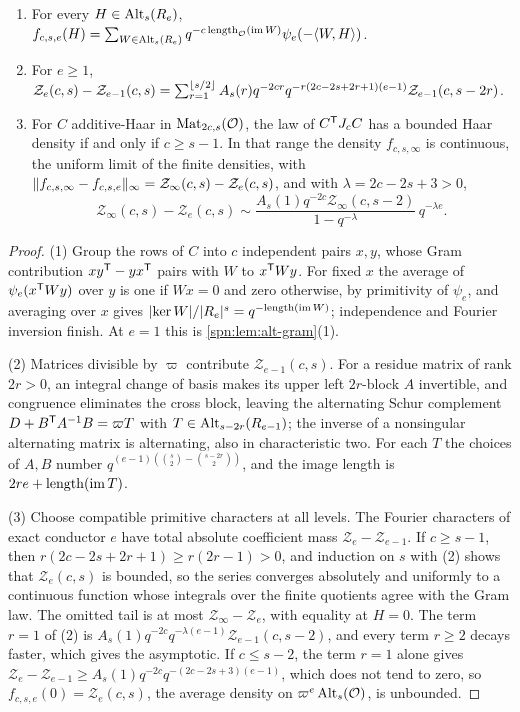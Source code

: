 \begin{theorem}\label{spn:thm:gram-regularity}
\begin{enumerate}
\item For every $H\in\operatorname{Alt}_s(R_e)$,
$f_{c,s,e}(H)=\sum_{W\in\operatorname{Alt}_s(R_e)}q^{-c\,\mathrm{length}_{\mathcal{O}}(\operatorname{im} W)}\psi_e(-\langle W,H\rangle)$.
\item For $e\ge1$,
$\mathcal Z_e(c,s)-\mathcal Z_{e-1}(c,s)=\sum_{r=1}^{\lfloor s/2\rfloor}A_s(r)q^{-2cr}q^{-r(2c-2s+2r+1)(e-1)}\mathcal Z_{e-1}(c,s-2r)$.
\item For $C$ additive-Haar in $\operatorname{Mat}_{2c,s}(\mathcal{O})$, the law of $C^{\mathsf{T}}J_cC$ has a bounded Haar
density if and only if $c\ge s-1$. In that range the density $f_{c,s,\infty}$ is continuous, the
uniform limit of the finite densities, with
$\lVert f_{c,s,\infty}-f_{c,s,e}\rVert_\infty=\mathcal Z_\infty(c,s)-\mathcal Z_e(c,s)$, and with $\lambda=2c-2s+3>0$,
\[
 \mathcal Z_\infty(c,s)-\mathcal Z_e(c,s)\sim\frac{A_s(1)q^{-2c}\mathcal Z_\infty(c,s-2)}{1-q^{-\lambda}}\,q^{-\lambda e}.
\]
\end{enumerate}
\end{theorem}

\begin{proof}
(1) Group the rows of $C$ into $c$ independent pairs $x,y$, whose Gram contribution
$xy^{\mathsf{T}}-yx^{\mathsf{T}}$ pairs with $W$ to $x^{\mathsf{T}}Wy$. For fixed $x$ the average of
$\psi_e(x^{\mathsf{T}}Wy)$ over $y$ is one if $Wx=0$ and zero otherwise, by primitivity of $\psi_e$, and
averaging over $x$ gives $\lvert\ker W\rvert/\lvert R_e\rvert^s=q^{-\mathrm{length}(\operatorname{im} W)}$; independence and
Fourier inversion finish. At $e=1$ this is \cref{spn:lem:alt-gram}(1).

(2) Matrices divisible by $\varpi$ contribute $\mathcal Z_{e-1}(c,s)$. For a residue matrix of rank $2r>0$, an
integral change of basis makes its upper left $2r$-block $A$ invertible, and congruence eliminates the
cross block, leaving the alternating Schur complement $D+B^{\mathsf{T}}A^{-1}B=\varpi T$ with
$T\in\operatorname{Alt}_{s-2r}(R_{e-1})$; the inverse of a nonsingular alternating matrix is alternating, also in
characteristic two. For each $T$ the choices of $A,B$ number
$q^{(e-1)(\binom s2-\binom{s-2r}2)}$, and the image length is $2re+\mathrm{length}(\operatorname{im} T)$.

(3) Choose compatible primitive characters at all levels. The Fourier characters of exact conductor
$e$ have total absolute coefficient mass $\mathcal Z_e-\mathcal Z_{e-1}$. If $c\ge s-1$, then
$r(2c-2s+2r+1)\ge r(2r-1)>0$, and induction on $s$ with (2) shows that $\mathcal Z_e(c,s)$ is bounded, so the
series converges absolutely and uniformly to a continuous function whose integrals over the finite
quotients agree with the Gram law. The omitted tail is at most $\mathcal Z_\infty-\mathcal Z_e$, with equality at
$H=0$. The term $r=1$ of (2) is $A_s(1)q^{-2c}q^{-\lambda(e-1)}\mathcal Z_{e-1}(c,s-2)$, and every term $r\ge2$
decays faster, which gives the asymptotic. If $c\le s-2$, the term $r=1$ alone gives
$\mathcal Z_e-\mathcal Z_{e-1}\ge A_s(1)q^{-2c}q^{-(2c-2s+3)(e-1)}$, which does not tend to zero, so
$f_{c,s,e}(0)=\mathcal Z_e(c,s)$, the average density on $\varpi^e\operatorname{Alt}_s(\mathcal{O})$, is unbounded.
\end{proof}

